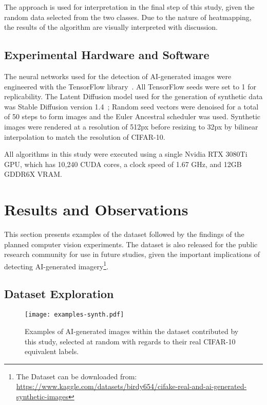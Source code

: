 \documentclass{article}
\begin{document}
The approach is used for interpretation in the final step of this study, given the random data selected from the two classes. Due to the nature of heatmapping, the results of the algorithm are visually interpreted with discussion.

\subsection{Experimental Hardware and Software}
\label{subsec:hardwaresoftware}
The neural networks used for the detection of AI-generated images were engineered with the TensorFlow library~\cite{tensorflow2015-whitepaper}. All TensorFlow seeds were set to 1 for replicability. The Latent Diffusion model used for the generation of synthetic data was Stable Diffusion version 1.4~\cite{rombach2022high}; Random seed vectors were denoised for a total of 50 steps to form images and the Euler Ancestral scheduler was used. Synthetic images were rendered at a resolution of 512px before resizing to 32px by bilinear interpolation to match the resolution of CIFAR-10.

All algorithms in this study were executed using a single Nvidia RTX 3080Ti GPU, which has 10,240 CUDA cores, a clock speed of 1.67 GHz, and 12GB GDDR6X VRAM. 



\section{Results and Observations}
\label{sec:results}
This section presents examples of the dataset followed by the findings of the planned computer vision experiments. The dataset is also released for the public research community for use in future studies, given the important implications of detecting AI-generated imagery\footnote{The Dataset can be downloaded from: \\\url{https://www.kaggle.com/datasets/birdy654/cifake-real-and-ai-generated-synthetic-images}}.

\subsection{Dataset Exploration}

\begin{figure}
    \centering
    \texttt{[image: examples-synth.pdf]}
    \caption{Examples of AI-generated images within the dataset contributed by this study, selected at random with regards to their real CIFAR-10 equivalent labels.}
    \label{fig:examples-synth}
\end{figure}
\end{document}

